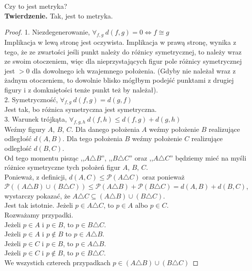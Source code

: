 \documentclass[a4paper, 12pt, twosided]{article}
\newcommand{\todo}[1]{\hfill \break \textbf{\Huge \textcolor{violet}{TO DO: #1} \hfill \break}
\normalsize}
\newcommand{\smalltodoII}[1]{\hfill \break \textbf{\ \textcolor{violet}{To do: #1}}\hfill \break}
\begin{document}
Czy to jest metryka? \\
\textbf{Twierdzenie.} Tak, jest to metryka.
\begin{proof}
    1. Niezdegenerowanie, $\forall_{f,g}\ d(f,g) = 0 \iff f \cong g$ \\ Implikacja w lewą stronę 
    jest oczywista.
     Implikacja w prawą 
    stronę,
    wynika z tego, że ze zwartości jeśli punkt należy do różnicy symetrycznej, to należy wraz 
    ze swoim 
    otoczeniem,
     więc dla nieprzystających figur pole różnicy symetrycznej jest $>0$ dla dowolnego ich 
     wzajemnego położenia. (Gdyby nie należał wraz z żadnym otoczeniem, to dowolnie 
     blisko
     mógłbym podejść punktami z drugiej figury i z domkniętości tenże punkt też by należał). \\
     2. Symetryczność, $\forall_{f,g}\ d(f,g ) = d(g,f)$ \\ Jest tak, bo różnica symetryczna jest 
     symetryczna. \\
     3. Warunek trójkąta, $\forall_{f,g,h}\ d(f,h) \leq d(f,g) + d(g,h)$  \\ 
     Weźmy figury $A$, $B$, $C$. Dla danego położenia $A$ weźmy położenie $B$ realizujące odległość 
     $d(A, B)$. Dla tego położenia $B$ weźmy położenie $C$ realizujące odległość $d(B, C)$. \\
     Od tego momentu pisząc ,,$A \triangle B$'', ,,$B \triangle C$'' oraz ,,$A \triangle C$'' 
     będziemy 
     mieć na myśli różnice symetryczne tych położeń figur $A$, $B$, $C$. \\
     Ponieważ, z definicji, $d(A, C) \leq \mathcal{P}(A \triangle C)$ oraz ponieważ
     $\mathcal{P}((A\triangle B)\cup(B \triangle C)) \leq \mathcal{P}(A\triangle B) + 
     \mathcal{P}(B \triangle C) = d(A, B) + d(B,C)$, wystarczy pokazać, że 
     $A \triangle C \subseteq (A\triangle B) \cup (B \triangle C)$. \\
     Jest tak istotnie. Jeżeli $p \in A \triangle C$, to $p \in A$ albo $p \in C$. \\
     Rozważamy przypadki. \\
      Jeżeli 
     $p \in A$ i $p \in B$, to $p \in B \triangle C$. \\ Jeżeli $p \in A$ i $p \notin B$ 
     to $p \in A \triangle B$. \\
     Jeżeli $p \in C$ i $p \in B$, to $p \in A \triangle B$. \\
     Jeżeli $p \in C$ i $p \notin B$, to $p \in B \triangle C$. \\
     We wszystich czterech przypadkach $p \in (A \triangle B) \cup (B \triangle C)$
\end{proof}
\end{document}
